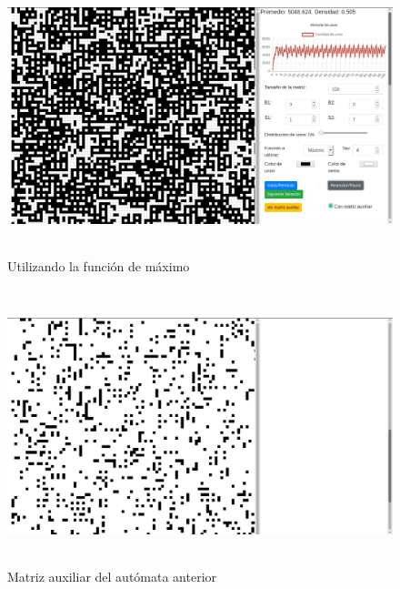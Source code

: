 \documentclass[12pt, titlepage]{article}
\begin{document}
\begin{figure}[H]
\begin{center}
 \includegraphics[width=15cm, height=8cm]{./img/3317-max.png}
 \caption{Utilizando la función de máximo}
 \label{fig:3317-max}
\end{center}
\end{figure}

\begin{figure}[H]
\begin{center}
 \includegraphics[width=15cm, height=8cm]{./img/3317-max-aux.png}
 \caption{Matriz auxiliar del autómata anterior}
 \label{fig:3317-max-aux}
\end{center}
\end{figure}
\end{document}
